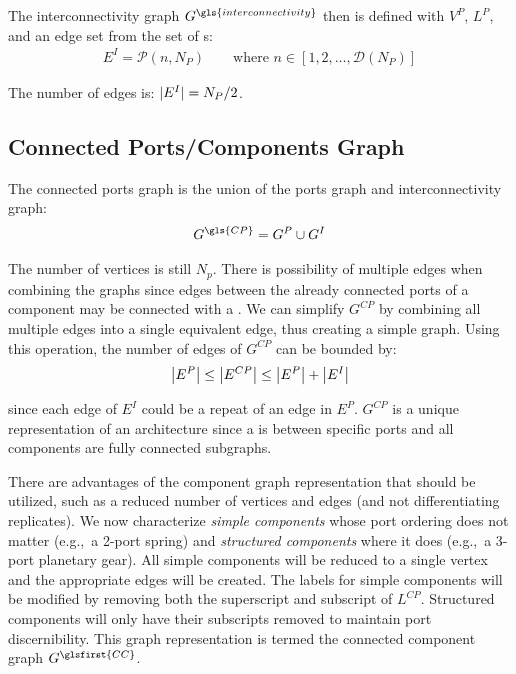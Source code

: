 The interconnectivity graph $G^{\gls{interconnectivity}}$ then is defined with $V^P$, $L^P$, and an edge set from the set of \mypm{}s:
\begin{align} \label{eq:ch2:Ppm}
E^I = \mathcal{P}(n,N_P) \qquad \text{where $n \in \left[ 1, 2, \dots, \mathcal{D}(N_P) \right]$}
\end{align}

\noindent The number of edges is: $\abs{E^I} = N_P/2$.





\subsection{Connected Ports/Components Graph}

The connected ports graph is the union of the ports graph and interconnectivity graph:
\begin{align}
G^{\gls{CP}}  = G^P \cup G^I
\end{align}

\noindent The number of vertices is still $N_p$. There is possibility of multiple edges when combining the graphs since edges between the already connected ports of a component may be connected with a \mypm{}. We can simplify $G^{CP}$ by combining all multiple edges into a single equivalent edge, thus creating a simple graph. Using this operation, the number of edges of $G^{CP}$ can be bounded by:
\begin{align}
\abs*{E^P} \leq \abs*{E^{CP}} \leq \abs*{E^P} + \abs*{E^I}
\end{align}

\noindent since each edge of $E^I$ could be a repeat of an edge in $E^P$. $G^{CP}$ is a unique representation of an architecture since a \mypm{} is between specific ports and all components are fully connected subgraphs. 

There are advantages of the component graph representation that should be utilized, such as a reduced number of vertices and edges (and not differentiating replicates). We now characterize \textit{simple components} whose port ordering does not matter (e.g.,~a 2-port spring) and \textit{structured components} where it does (e.g.,~a 3-port planetary gear). All simple components will be reduced to a single vertex and the appropriate edges will be created. The labels for simple components will be modified by removing both the superscript and subscript of $L^{CP}$. Structured components will only have their subscripts removed to maintain port discernibility. This graph representation is termed the connected component graph $G^{\glsfirst{CC}}$.

